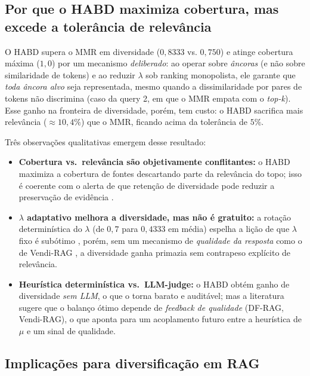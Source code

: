 \subsection{Por que o HABD maximiza cobertura, mas excede a tolerância de relevância}

O HABD supera o MMR em diversidade ($0{,}8333$ vs. $0{,}750$) e atinge cobertura
máxima ($1{,}0$) por um mecanismo \emph{deliberado}: ao operar sobre \emph{âncoras}
(e não sobre similaridade de tokens) e ao reduzir $\lambda$ sob ranking
monopolista, ele garante que \emph{toda âncora alvo} seja representada, mesmo
quando a dissimilaridade por pares de tokens não discrimina (caso da query 2, em
que o MMR empata com o \emph{top-k}). Esse ganho na fronteira de diversidade,
porém, tem custo: o HABD sacrifica mais relevância ($\approx 10{,}4\%$) que o MMR,
ficando acima da tolerância de $5\%$.

Três observações qualitativas emergem desse resultado:
\begin{itemize}
  \item \textbf{Cobertura vs.\ relevância são objetivamente conflitantes:} o HABD
        maximiza a cobertura de fontes descartando parte da relevância do topo;
        isso é coerente com o alerta de que retenção de diversidade pode reduzir a
        preservação de evidência \citep{Khan2026DFRAG}.
  \item \textbf{$\lambda$ adaptativo melhora a diversidade, mas não é gratuito:}
        a rotação determinística do $\lambda$ (de $0{,}7$ para $0{,}4333$ em média)
        espelha a lição de que $\lambda$ fixo é subótimo
        \citep{Khan2026DFRAG,GuoSanner2010PLMMR}, porém, sem um mecanismo de
        \emph{qualidade da resposta} como o de Vendi-RAG
        \citep{RezaeiDieng2025VendiRAG}, a diversidade ganha primazia sem
        contrapeso explícito de relevância.
  \item \textbf{Heurística determinística vs.\ LLM-judge:} o HABD obtém ganho de
        diversidade \emph{sem LLM}, o que o torna barato e auditável; mas a
        literatura sugere que o balanço ótimo depende de \emph{feedback de
        qualidade} (DF-RAG, Vendi-RAG), o que aponta para um acoplamento futuro
        entre a heurística de $\mu$ e um sinal de qualidade.
\end{itemize}

\subsection{Implicações para diversificação em RAG}

